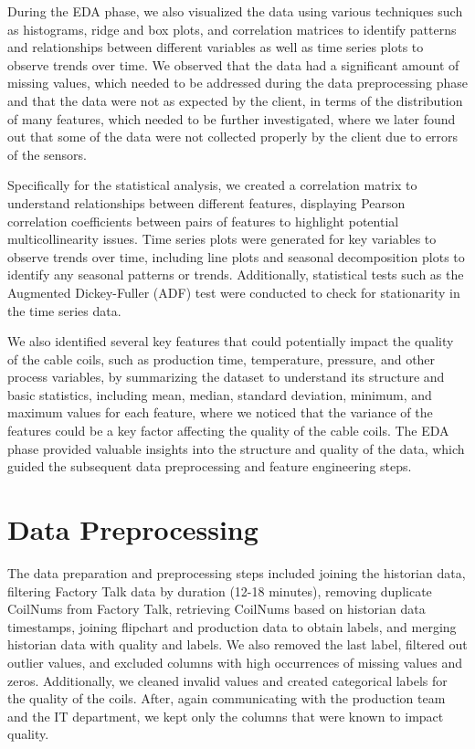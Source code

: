 During the EDA phase, we also visualized the data using various techniques such
as histograms, ridge and box plots, and correlation matrices to identify
patterns and relationships between different variables as well as time series
plots to observe trends over time. We observed that the data had a significant
amount of missing values, which needed to be addressed during the data
preprocessing phase and that the data were not as expected by the client, in
terms of the distribution of many features, which needed to be further
investigated, where we later found out that some of the data were not collected
properly by the client due to errors of the sensors.

Specifically for the statistical analysis, we created a correlation matrix to
understand relationships between different features, displaying Pearson
correlation coefficients between pairs of features to highlight potential
multicollinearity issues. Time series plots were generated for key variables to
observe trends over time, including line plots and seasonal decomposition plots
to identify any seasonal patterns or trends. Additionally, statistical tests
such as the Augmented Dickey-Fuller (ADF) test were conducted to check for
stationarity in the time series data.

We also identified several key features that could potentially impact the
quality of the cable coils, such as production time, temperature, pressure, and
other process variables, by summarizing the dataset to understand its structure
and basic statistics, including mean, median, standard deviation, minimum, and
maximum values for each feature, where we noticed that the variance of the
features could be a key factor affecting the quality of the cable coils. The
EDA phase provided valuable insights into the structure and quality of the
data, which guided the subsequent data preprocessing and feature engineering
steps.

\section{Data Preprocessing}

The data preparation and preprocessing steps included joining the historian
data, filtering Factory Talk data by duration (12-18 minutes), removing
duplicate CoilNums from Factory Talk, retrieving CoilNums based on historian
data timestamps, joining flipchart and production data to obtain labels, and
merging historian data with quality and labels. We also removed the last label,
filtered out outlier values, and excluded columns with high occurrences of
missing values and zeros. Additionally, we cleaned invalid values and created
categorical labels for the quality of the coils. After, again communicating
with the production team and the IT department, we kept only the columns that
were known to impact quality.

